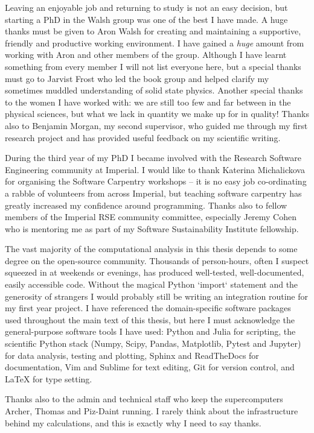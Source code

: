 Leaving an enjoyable job and returning to study is not an easy decision, but starting a PhD in the Walsh group was one of the best I have made. A huge thanks must be given to Aron Walsh for creating and maintaining a supportive, friendly and productive working environment. I have gained a \textit{huge} amount from working with Aron and other members of the group. Although I have learnt something from every member I will not list everyone here, but a special thanks must go to Jarvist Frost who led the book group and helped clarify my sometimes muddled understanding of solid state physics. Another special thanks to the women I have worked with: we are still too few and far between in the physical sciences, but what we lack in quantity we make up for in quality! Thanks also to Benjamin Morgan, my second supervisor, who guided me through my first research project and has provided useful feedback on my scientific writing. 

During the third year of my PhD I became involved with the Research Software Engineering community at Imperial. I would like to thank Katerina Michalickova for organising the Software Carpentry workshops -- it is no easy job co-ordinating a rabble of volunteers from across Imperial, but teaching software carpentry has greatly increased my confidence around programming. Thanks also to fellow members of the Imperial RSE community committee, especially Jeremy Cohen who is mentoring me as part of my Software Sustainability Institute fellowship.

The vast majority of the computational analysis in this thesis depends to some degree on the open-source community. Thousands of person-hours, often I suspect squeezed in at weekends or evenings, has produced well-tested, well-documented, easily accessible code. Without the magical Python `import` statement and the generosity of strangers I would probably still be writing an integration routine for my first year project. I have referenced the domain-specific software packages used throughout the main text of this thesis, but here I must acknowledge the general-purpose software tools I have used: Python and Julia for scripting, the scientific Python stack (Numpy, Scipy, Pandas, Matplotlib, Pytest and Jupyter) for data analysis, testing and plotting, Sphinx and ReadTheDocs for documentation, Vim and Sublime for text editing, Git for version control, and LaTeX for type setting.

Thanks also to the admin and technical staff who keep the supercomputers Archer, Thomas and Piz-Daint running. I rarely think about the infrastructure behind my calculations, and this is exactly why I need to say thanks.


